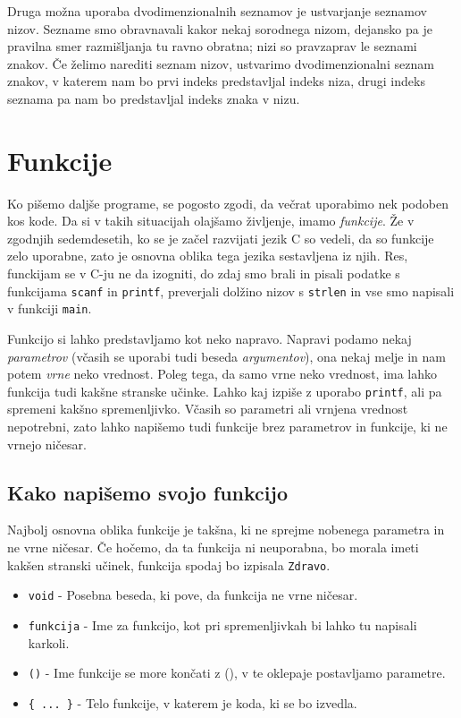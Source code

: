 \documentclass{book}
\begin{document}
Druga možna uporaba dvodimenzionalnih seznamov je ustvarjanje seznamov nizov.
Sezname smo obravnavali kakor nekaj sorodnega nizom, dejansko pa je pravilna
smer razmišljanja tu ravno obratna; nizi so pravzaprav le seznami znakov.
Če želimo narediti seznam nizov, ustvarimo dvodimenzionalni seznam znakov, v
katerem nam bo prvi indeks predstavljal indeks niza, drugi indeks seznama pa nam
bo predstavljal indeks znaka v nizu.

\chapter{Funkcije}

Ko pišemo daljše programe, se pogosto zgodi, da večrat uporabimo nek podoben
kos kode. Da si v takih situacijah olajšamo življenje, imamo \emph{funkcije}.
Že v zgodnjih sedemdesetih, ko se je začel razvijati jezik C so vedeli, da so
funkcije zelo uporabne, zato je osnovna oblika tega jezika sestavljena iz njih.
Res, funckijam se v C-ju ne da izogniti, do zdaj smo brali in pisali podatke s
funkcijama \verb+scanf+ in \verb+printf+, preverjali dolžino nizov s
\verb+strlen+ in vse smo napisali v funkciji \verb+main+.

Funkcijo si lahko predstavljamo kot neko napravo. Napravi podamo nekaj
\emph{parametrov} (včasih se uporabi tudi beseda \emph{argumentov}), ona nekaj
melje in nam potem \emph{vrne} neko vrednost. Poleg tega, da samo vrne neko
vrednost, ima lahko funkcija tudi kakšne stranske učinke. Lahko kaj izpiše z
uporabo \verb+printf+, ali pa spremeni kakšno spremenljivko. Včasih so
parametri ali vrnjena vrednost nepotrebni, zato lahko napišemo tudi funkcije
brez parametrov in funkcije, ki ne vrnejo ničesar.


\section{Kako napišemo svojo funkcijo}

Najbolj osnovna oblika funkcije je takšna, ki ne sprejme nobenega parametra in
ne vrne ničesar. Če hočemo, da ta funkcija ni neuporabna, bo morala imeti
kakšen stranski učinek, funkcija spodaj bo izpisala \verb+Zdravo+.

\begin{examples}
\end{examples}

\begin{itemize}
    \item \verb+void+ - Posebna beseda, ki pove, da funkcija ne vrne ničesar.
    \item \verb+funkcija+ - Ime za funkcijo, kot pri spremenljivkah bi lahko tu
        napisali karkoli.
    \item \verb+()+ - Ime funkcije se more končati z (), v te oklepaje
        postavljamo parametre.
    \item \verb+{ ... }+ - Telo funkcije, v katerem je koda, ki se bo izvedla.
\end{itemize}
\end{document}
